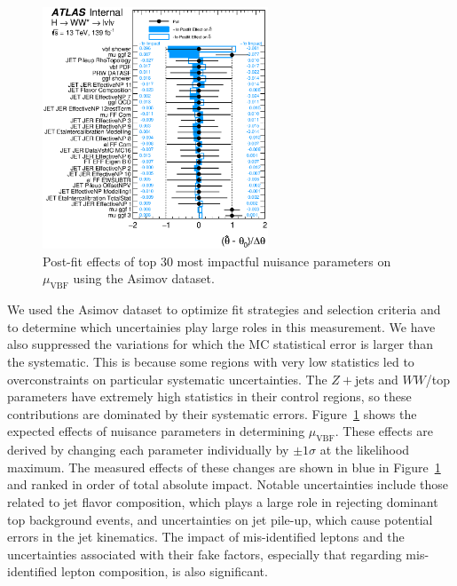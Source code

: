 \begin{figure}[!h]
\centering
      \includegraphics[width=0.6\textwidth]{Pictures/fitresults/impact_asimov_mu_vbf.eps}
\caption{Post-fit effects of top 30 most impactful nuisance parameters on $\mu_{\text{VBF}}$ using the Asimov dataset.}
\label{fig:impactsasimov}
\end{figure}

We used the Asimov dataset to optimize fit strategies and selection criteria and to determine which uncertainies play large roles in this measurement. We have also suppressed the variations for which the MC statistical error is larger than the systematic. This is because some regions with very low statistics led to overconstraints on particular systematic uncertainties. The $Z+$jets and $WW$/top parameters have extremely high statistics in their control regions, so these contributions are dominated by their systematic errors. Figure~\ref{fig:impactsasimov} shows the expected effects of nuisance parameters in determining $\mu_{\text{VBF}}$. These effects are derived by changing each parameter individually by $\pm 1\sigma$ at the likelihood maximum. The measured effects of these changes are shown in blue in Figure~\ref{fig:impactsasimov} and ranked in order of total absolute impact. Notable uncertainties include those related to jet flavor composition, which plays a large role in rejecting dominant top background events, and uncertainties on jet pile-up, which cause potential errors in the jet kinematics. The impact of mis-identified leptons and the uncertainties associated with their fake factors, especially that regarding mis-identified lepton composition, is also significant.

